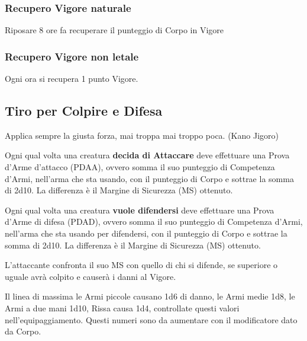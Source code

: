 \documentclass[12pt,a4paper,twoside,openany]{book}
\begin{document}
\begin{multicols}{2}
\subsubsection{Recupero Vigore naturale}\label{recuperopuntiferitanaturale} 

Riposare 8 ore fa recuperare il punteggio di Corpo in Vigore

\subsubsection{Recupero Vigore non letale}\label{recuperopuntiferitanonletali}\hypertarget{recuperopuntiferitanonletali}{}

Ogni ora si recupera 1 punto Vigore.

\subsection{Tiro per Colpire e Difesa}\label{tiropercolpireedifesa}

\begin{changemargin}{0.3cm}{0.3cm}\begin{enfasi}{Applica sempre la giusta forza, mai troppa mai troppo poca. (Kano Jigoro)}\end{enfasi}\end{changemargin}\medskip

Ogni qual volta una creatura \textbf{decida di Attaccare} deve effettuare una Prova d'Arme d'attacco (PDAA), ovvero somma il suo punteggio di Competenza d'Armi, nell'arma che sta usando, con il punteggio di Corpo e sottrae la somma di 2d10. La differenza è il Margine di Sicurezza (MS) ottenuto.

Ogni qual volta una creatura \textbf{vuole difendersi} deve effettuare una Prova d'Arme di difesa (PDAD),  ovvero somma il suo punteggio di Competenza d'Armi, nell'arma che sta usando per difendersi, con il punteggio di Corpo e sottrae la somma di 2d10. La differenza è il Margine di Sicurezza (MS) ottenuto.

L'attaccante confronta il suo MS con quello di chi si difende, se superiore o uguale avrà colpito e causerà i danni al Vigore.

Il linea di massima le Armi piccole causano 1d6 di danno, le Armi medie 1d8, le Armi a due mani 1d10, Rissa causa 1d4, controllate questi valori nell'equipaggiamento. Questi numeri sono da aumentare con il modificatore dato da Corpo.


\end{multicols}
\end{document}
